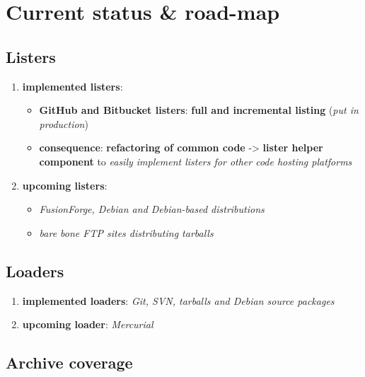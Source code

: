 \documentclass[11pt]{article}
\providecommand{\tightlist}{%
      \setlength{\itemsep}{0pt}\setlength{\parskip}{0pt}}
\begin{document}
\hypertarget{current-status-road-map}{%
\section{Current status \& road-map}\label{current-status-road-map}}

\hypertarget{listers}{%
\subsection{Listers}\label{listers}}

\begin{enumerate}
\def\labelenumi{\arabic{enumi}.}
\tightlist
\item
  \textbf{implemented listers}:

  \begin{itemize}
  \tightlist
  \item
    \textbf{GitHub and Bitbucket listers}: \textbf{full and incremental
    listing} (\emph{put in production})
  \item
    \textbf{consequence}: \textbf{refactoring of common code}
    -\textgreater{} \textbf{lister helper component} to \emph{easily
    implement listers for other code hosting platforms}
  \end{itemize}
\item
  \textbf{upcoming listers}:

  \begin{itemize}
  \tightlist
  \item
    \emph{FusionForge, Debian and Debian-based distributions}
  \item
    \emph{bare bone FTP sites distributing tarballs}
  \end{itemize}
\end{enumerate}

\hypertarget{loaders}{%
\subsection{Loaders}\label{loaders}}

\begin{enumerate}
\def\labelenumi{\arabic{enumi}.}
\tightlist
\item
  \textbf{implemented loaders}: \emph{Git, SVN, tarballs and Debian
  source packages}
\item
  \textbf{upcoming loader}: \emph{Mercurial}
\end{enumerate}

\hypertarget{archive-coverage}{%
\subsection{Archive coverage}\label{archive-coverage}}
\end{document}
